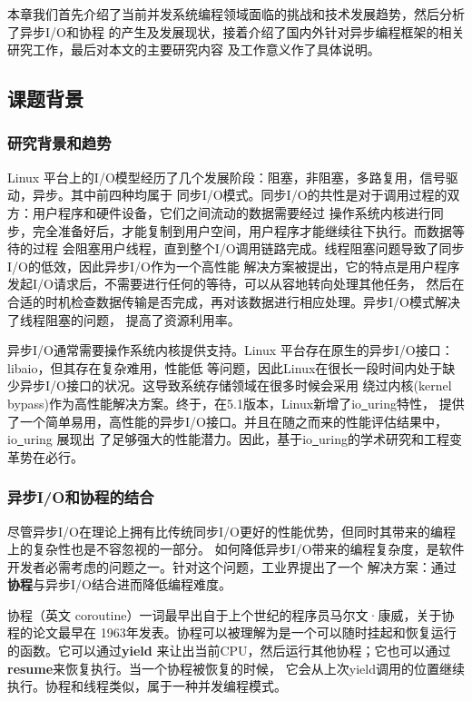 \documentclass[supercite]{HustGraduPaper}
\theoremstyle{definition}
\begin{document}
本章我们首先介绍了当前并发系统编程领域面临的挑战和技术发展趋势，然后分析了异步I/O和协程
的产生及发展现状，接着介绍了国内外针对异步编程框架的相关研究工作，最后对本文的主要研究内容
及工作意义作了具体说明。

\subsection{课题背景}

\subsubsection{研究背景和趋势}
Linux 平台上的I/O模型经历了几个发展阶段：阻塞，非阻塞，多路复用，信号驱动，异步。其中前四种均属于
同步I/O模式。同步I/O的共性是对于调用过程的双方：用户程序和硬件设备，它们之间流动的数据需要经过
操作系统内核进行同步，完全准备好后，才能复制到用户空间，用户程序才能继续往下执行。而数据等待的过程
会阻塞用户线程，直到整个I/O调用链路完成。线程阻塞问题导致了同步I/O的低效，因此异步I/O作为一个高性能
解决方案被提出，它的特点是用户程序发起I/O请求后，不需要进行任何的等待，可以从容地转向处理其他任务，
然后在合适的时机检查数据传输是否完成，再对该数据进行相应处理。异步I/O模式解决了线程阻塞的问题，
提高了资源利用率。\par

异步I/O通常需要操作系统内核提供支持。Linux 平台存在原生的异步I/O接口：libaio，但其存在复杂难用，性能低
等问题，因此Linux在很长一段时间内处于缺少异步I/O接口的状况。这导致系统存储领域在很多时候会采用
绕过内核(kernel bypass)作为高性能解决方案。终于，在5.1版本，Linux新增了io\underline{~}uring特性，
提供了一个简单易用，高性能的异步I/O接口。并且在随之而来的性能评估结果中，io\underline{~}uring 展现出
了足够强大的性能潜力。因此，基于io\underline{~}uring的学术研究和工程变革势在必行。\par

\subsubsection{异步I/O和协程的结合}
尽管异步I/O在理论上拥有比传统同步I/O更好的性能优势，但同时其带来的编程上的复杂性也是不容忽视的一部分。
如何降低异步I/O带来的编程复杂度，是软件开发者必需考虑的问题之一。针对这个问题，工业界提出了一个
解决方案：通过\textbf{协程}与异步I/O结合进而降低编程难度。\par

协程（英文 coroutine）一词最早出自于上个世纪的程序员马尔文·康威，关于协程的论文\cite{paper1}最早在
1963年发表。协程可以被理解为是一个可以随时挂起和恢复运行的函数。它可以通过\textbf{yield}
来让出当前CPU，然后运行其他协程；它也可以通过\textbf{resume}来恢复执行。当一个协程被恢复的时候，
它会从上次yield调用的位置继续执行。协程和线程类似，属于一种并发编程模式。\par
\end{document}
